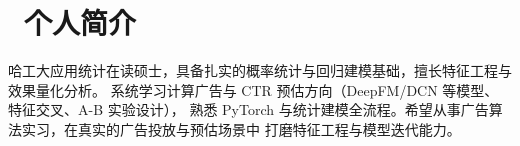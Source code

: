 \section{\faUser\ 个人简介}
哈工大应用统计在读硕士，具备扎实的概率统计与回归建模基础，擅长特征工程与效果量化分析。
系统学习计算广告与 CTR 预估方向（DeepFM/DCN 等模型、特征交叉、A-B 实验设计），
熟悉 PyTorch 与统计建模全流程。希望从事广告算法实习，在真实的广告投放与预估场景中
打磨特征工程与模型迭代能力。
